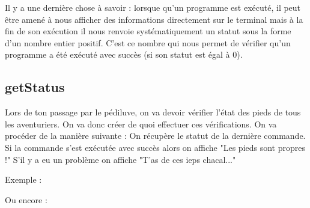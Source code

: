 \documentclass[a4paper, 12pt]{article}
\begin{document}
{    \vspace{0.6cm}
    
    \vspace{0.6cm}


    \vspace{2cm}
    Il y a une dernière chose à savoir : lorsque qu'un programme est exécuté, il peut être amené à nous afficher
    des informations directement sur le terminal mais à la fin de son exécution il nous renvoie systématiquement un statut
    sous la forme d'un nombre entier positif. C'est ce nombre qui nous permet de
    vérifier qu'un programme a été exécuté avec succès (si son statut est égal à 0).
    \vspace{4cm}

    \subsection{getStatus}

    Lors de ton passage par le pédiluve, on va devoir vérifier l'état des pieds de tous les
    aventuriers. On va donc créer de quoi effectuer ces vérifications.
    \newline \newline
    On va procéder de la manière suivante :
    \newline \newline
    On récupère le statut de la dernière commande. Si la commande
    s'est exécutée avec succès alors on affiche "Les pieds sont propres !"
    S'il y a eu un problème on affiche "T'as de ces ieps chacal..."
    \newline \newline

    Exemple :


    Ou encore :

    
}
\end{document}
